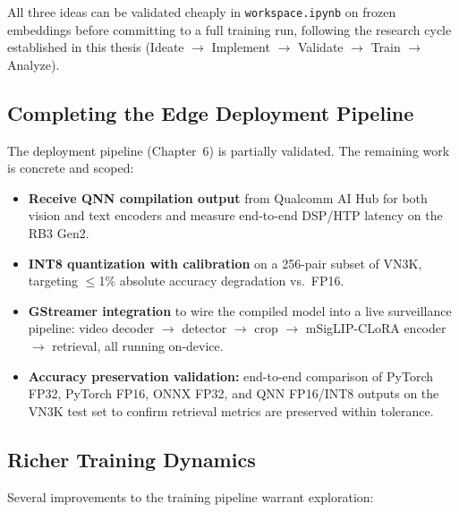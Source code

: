 \documentclass[../main.tex]{subfiles}
\begin{document}
\noindent All three ideas can be validated cheaply in \texttt{workspace.ipynb} on frozen embeddings before committing to a full training run, following the research cycle established in this thesis (Ideate $\to$ Implement $\to$ Validate $\to$ Train $\to$ Analyze).

\subsection{Completing the Edge Deployment Pipeline}
\label{sec:fw_deployment}

\noindent The deployment pipeline (Chapter~6) is partially validated. The remaining work is concrete and scoped:

\begin{itemize}
    \item \textbf{Receive QNN compilation output} from Qualcomm AI Hub for both vision and text encoders and measure end-to-end DSP/HTP latency on the RB3 Gen2.
    \item \textbf{INT8 quantization with calibration} on a 256-pair subset of VN3K, targeting $\leq$1\% absolute accuracy degradation vs.\ FP16.
    \item \textbf{GStreamer integration} to wire the compiled model into a live surveillance pipeline: video decoder $\to$ detector $\to$ crop $\to$ mSigLIP-CLoRA encoder $\to$ retrieval, all running on-device.
    \item \textbf{Accuracy preservation validation:} end-to-end comparison of PyTorch FP32, PyTorch FP16, ONNX FP32, and QNN FP16/INT8 outputs on the VN3K test set to confirm retrieval metrics are preserved within tolerance.
\end{itemize}

\subsection{Richer Training Dynamics}

\noindent Several improvements to the training pipeline warrant exploration:
\end{document}
